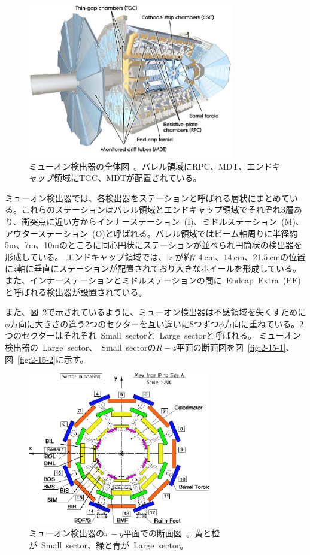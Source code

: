 \begin{figure}[h]
  \centering
  \includegraphics[clip, width=9cm]{fig/2/muondetector.pdf}
  \caption{ミューオン検出器の全体図~\cite{Aad:1129811}。バレル領域にRPC、MDT、エンドキャップ領域にTGC、MDTが配置されている。}
  \label{fig:2-13}
\end{figure}

ミューオン検出器では、各検出器をステーションと呼ばれる層状にまとめている。これらのステーションはバレル領域とエンドキャップ領域でそれぞれ3層あり、衝突点に近い方からインナーステーション~(I)、ミドルステーション~(M)、アウターステーション~(O)と呼ばれる。バレル領域ではビーム軸周りに半径約5m、7m、10mのところに同心円状にステーションが並べられ円筒状の検出器を形成している。
エンドキャップ領域では、$|z|$が約$\SI{7.4}{\cm}$、$\SI{14}{\cm}$、$\SI{21.5}{\cm}$の位置に$z$軸に垂直にステーションが配置されており大きなホイールを形成している。また、インナーステーションとミドルステーションの間に~Endcap~Extra~(EE)と呼ばれる検出器が設置されている。

また、図~\ref{fig:2-14}で示されているように、ミューオン検出器は不感領域を失くすために$\phi$方向に大きさの違う2つのセクターを互い違いに8つずつ$\phi$方向に重ねている。2つのセクターはそれぞれ~Small~sectorと~Large~sectorと呼ばれる。
ミューオン検出器の~Large~sector、~Small~sectorの$R-z$平面の断面図を図~\ref{fig:2-15-1}、図~\ref{fig:2-15-2}に示す。

\begin{figure}[h]
  \centering
  \includegraphics[clip, width=8cm]{fig/2/muon_detector_xy.pdf}
  \caption{ミューオン検出器の$x-y$平面での断面図~\cite{Aad:1129811}。黄と橙が~Small~sector、緑と青が~Large~sector。}
  \label{fig:2-14}
\end{figure}

